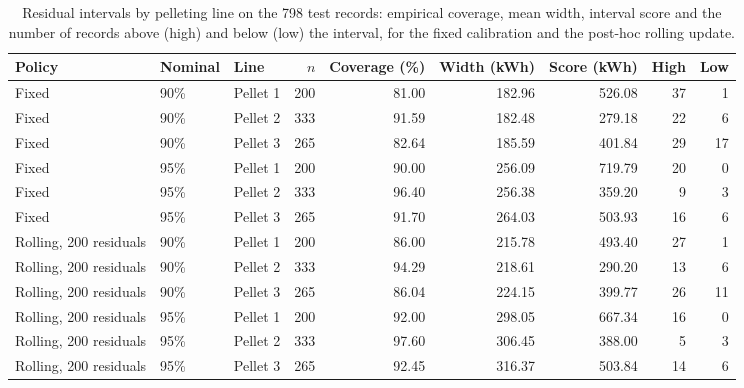 \begin{table}[!htbp]\centering\footnotesize
\caption{Residual intervals by pelleting line on the 798 test records: empirical coverage, mean width, interval score and the number of records above (high) and below (low) the interval, for the fixed calibration and the post-hoc rolling update.}\label{tab:s_intervals_line}
\begin{tabular}{@{}lllrrrrrr@{}}\toprule
Policy & Nominal & Line & $n$ & Coverage (\%) & Width (kWh) & Score (kWh) & High & Low \\\midrule
Fixed & 90\% & Pellet 1 & 200 & 81.00 & 182.96 & 526.08 & 37 & 1 \\
Fixed & 90\% & Pellet 2 & 333 & 91.59 & 182.48 & 279.18 & 22 & 6 \\
Fixed & 90\% & Pellet 3 & 265 & 82.64 & 185.59 & 401.84 & 29 & 17 \\
Fixed & 95\% & Pellet 1 & 200 & 90.00 & 256.09 & 719.79 & 20 & 0 \\
Fixed & 95\% & Pellet 2 & 333 & 96.40 & 256.38 & 359.20 & 9 & 3 \\
Fixed & 95\% & Pellet 3 & 265 & 91.70 & 264.03 & 503.93 & 16 & 6 \\
Rolling, 200 residuals & 90\% & Pellet 1 & 200 & 86.00 & 215.78 & 493.40 & 27 & 1 \\
Rolling, 200 residuals & 90\% & Pellet 2 & 333 & 94.29 & 218.61 & 290.20 & 13 & 6 \\
Rolling, 200 residuals & 90\% & Pellet 3 & 265 & 86.04 & 224.15 & 399.77 & 26 & 11 \\
Rolling, 200 residuals & 95\% & Pellet 1 & 200 & 92.00 & 298.05 & 667.34 & 16 & 0 \\
Rolling, 200 residuals & 95\% & Pellet 2 & 333 & 97.60 & 306.45 & 388.00 & 5 & 3 \\
Rolling, 200 residuals & 95\% & Pellet 3 & 265 & 92.45 & 316.37 & 503.84 & 14 & 6 \\
\bottomrule
\end{tabular}
\end{table}

